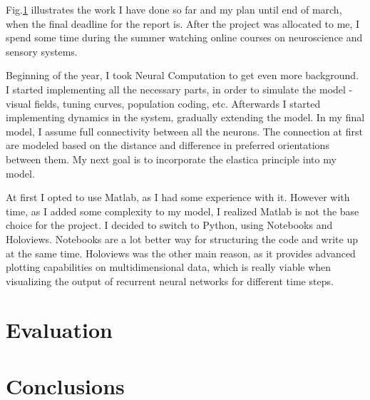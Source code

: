 \begin{figure}
\label{timeline}
\end{figure}

Fig.\ref{timeline} illustrates the work I have done so far and my plan until end of march, when the final deadline for the report is. After the project was allocated to me, I spend some time during the summer watching online courses on neuroscience and sensory systems.

Beginning of the year, I took Neural Computation to get even more background. I started implementing all the necessary parts, in order to simulate the model - visual fields, tuning curves, population coding, etc. Afterwards I started implementing dynamics in the system, gradually extending the model. In my final model, I assume full connectivity between all the neurons. The connection at first are modeled based on the distance and difference in preferred orientations between them. My next goal is to incorporate the elastica principle into my model. 

At first I opted to use Matlab, as I had some experience with it. However with time, as I added some complexity to my model, I realized Matlab is not the base choice for the project. I decided to switch to Python, using Notebooks and Holoviews. Notebooks are a lot better way for structuring the code and write up at the same time. Holoviews was the other main reason, as it provides advanced plotting capabilities on multidimensional data, which is really viable when visualizing the output of recurrent neural networks for different time steps.



\chapter{Evaluation}

\chapter{Conclusions}





